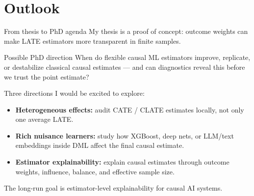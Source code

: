 \documentclass[11pt]{beamer}
\begin{document}
\section{Outlook}
\begin{frame}{From thesis to PhD agenda}
My thesis is a proof of concept: outcome weights can make LATE estimators more transparent in finite samples.

\vspace{0.25cm}

\begin{block}{Possible PhD direction}
When do flexible causal ML estimators improve, replicate, or destabilize classical causal estimates --- and can diagnostics reveal this before we trust the point estimate?
\end{block}

\vspace{0.25cm}

Three directions I would be excited to explore:

\begin{itemize}
\item \textbf{Heterogeneous effects:} audit CATE / CLATE estimates locally, not only one average LATE.

\item \textbf{Rich nuisance learners:} study how XGBoost, deep nets, or LLM/text embeddings inside DML affect the final causal estimate.

\item \textbf{Estimator explainability:} explain causal estimates through outcome weights, influence, balance, and effective sample size.
\end{itemize}

\vspace{0.25cm}
\centering
\alert{The long-run goal is estimator-level explainability for causal AI systems.}

\end{frame}
\end{document}
